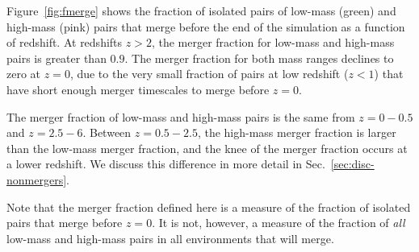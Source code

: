 \documentclass[twocolumn,linenumbers]{aastex631}
\begin{document}
    Figure~\ref{fig:fmerge} shows the fraction of isolated pairs of low-mass (green) and high-mass (pink) pairs that merge before the end of the simulation as a function of redshift. 
    At redshifts $z>2$, the merger fraction for low-mass and high-mass pairs is greater than $0.9$.
    The merger fraction for both mass ranges declines to zero at $z=0$, due to the very small fraction of pairs at low redshift ($z<1$) that have short enough merger timescales to merge before $z=0$.
    
    The merger fraction of low-mass and high-mass pairs is the same from $z=0-0.5$ and $z=2.5-6$. 
    Between $z=0.5-2.5$, the high-mass merger fraction is larger than the low-mass merger fraction, and the knee of the merger fraction occurs at a lower redshift. 
    We discuss this difference in more detail in Sec.~\ref{sec:disc-nonmergers}.

    Note that the merger fraction defined here is a measure of the fraction of isolated pairs that merge before $z=0$. It is not, however, a measure of the fraction of \textit{all} low-mass and high-mass pairs in all environments that will merge. 




\end{document}

